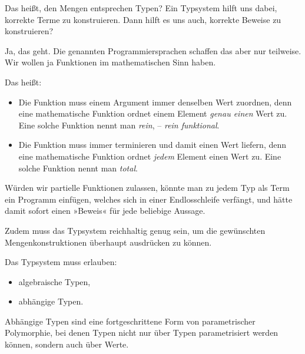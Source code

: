 \documentclass[9pt]{beamer}
\begin{document}
\begin{frame}
Das heißt, den Mengen entsprechen Typen? Ein Typsystem
hilft uns dabei, korrekte Terme zu konstruieren. Dann hilft es
uns auch, korrekte Beweise zu konstruieren?\pause

\vspace{1em}
Ja, das geht. Die genannten Programmiersprachen schaffen das aber
nur teilweise. Wir wollen ja Funktionen im mathematischen
Sinn haben.\pause

\vspace{1em}
Das heißt:
\begin{itemize}
\item Die Funktion muss einem Argument immer denselben Wert
zuordnen, denn eine mathematische Funktion ordnet einem Element
\emph{genau einen} Wert zu. Eine solche Funktion nennt man
\emph{rein}, -- \emph{rein funktional}.

\item Die Funktion muss immer terminieren und damit einen
Wert liefern, denn eine mathematische Funktion ordnet \emph{jedem}
Element einen Wert zu. Eine solche Funktion nennt man
\emph{total}.
\end{itemize}\pause

{\small
Würden wir partielle Funktionen zulassen, könnte man zu jedem Typ
als Term ein Programm einfügen, welches sich in einer
Endlosschleife verfängt, und hätte damit sofort einen »Beweis« für jede
beliebige Aussage.}
\end{frame}

\begin{frame}
Zudem muss das Typsystem reichhaltig genug sein, um die
gewünschten Mengenkonstruktionen überhaupt ausdrücken zu können.\pause

\vspace{1em}
Das Typsystem muss erlauben:
\begin{itemize}
\item algebraische Typen,
\item abhängige Typen.
\end{itemize}\pause

\vspace{1em}
Abhängige Typen sind eine fortgeschrittene Form von parametrischer
Polymorphie, bei denen Typen nicht nur über Typen parametrisiert
werden können, sondern auch über Werte.
\end{frame}
\end{document}
